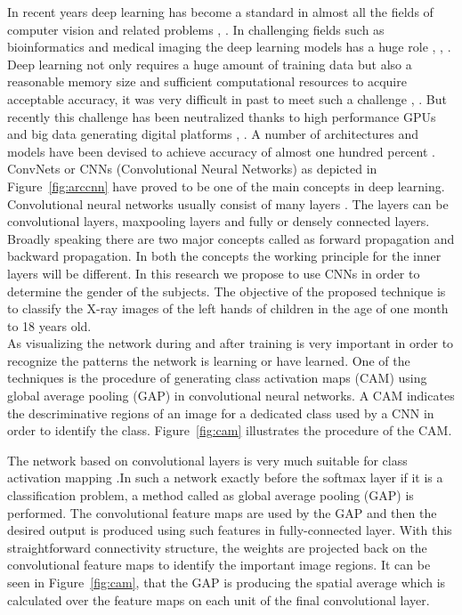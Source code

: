 \documentclass{bioinfo}
\begin{document}
 
In recent years deep learning has become a standard in almost all the fields of computer vision and related problems \citep{bwang17}, \citep{david17}. In challenging fields such as bioinformatics and medical imaging the deep learning models has a huge role \citep{kskur17}, \citep{bzhu16}, \citep{dbard18}. Deep learning not only requires a huge amount of training data but also a reasonable memory size and sufficient computational resources to acquire acceptable accuracy, it was very difficult in past to meet such a challenge \citep{mhu11}, \citep{sakcay18}. But recently this challenge has been neutralized thanks to high performance GPUs and big data generating digital platforms \citep{fskhan14}, \citep{inyu17}. A number of architectures and models have been devised to achieve accuracy of almost one hundred percent \citep{jzhou17}. ConvNets or CNNs (Convolutional Neural Networks) as depicted in Figure~\ref{fig:arccnn} have proved to be one of the main concepts in deep learning. Convolutional neural networks usually consist of many layers \citep{david17}. The layers can be convolutional layers, maxpooling layers and fully or densely connected layers. Broadly speaking there are two major concepts called as forward propagation and backward propagation. In both the concepts the working principle for the inner layers will be different. In this research we propose to use CNNs in order to determine the gender of the subjects. The objective of the proposed technique is to classify the X-ray images of the left hands of children in the age of one month to 18 years old.\\
As visualizing the network during and after training is very important in order to recognize the patterns the network is learning or have learned. One of the techniques is the procedure of generating class activation maps (CAM) \citep{bzhu16} using global average pooling (GAP) \citep{bzhu16} in convolutional neural networks. A CAM indicates the descriminative regions of an image for a dedicated class used by a CNN in order to identify the class. Figure~\ref{fig:cam} illustrates the procedure of the CAM. 

The network based on convolutional layers is very much suitable for class activation mapping .In such a network exactly before the softmax layer if it is a classification problem, a method called as global average pooling (GAP)\citep{bzhu16} is performed. The convolutional feature maps are used by the GAP and then the desired output is produced using such features in fully-connected layer. With this straightforward connectivity structure, the weights are projected back  on the convolutional feature maps to identify the important image regions. It can be seen in Figure~\ref{fig:cam}, that the GAP is producing the spatial average which is calculated over the feature maps on each unit of the final convolutional layer. 
\end{document}
